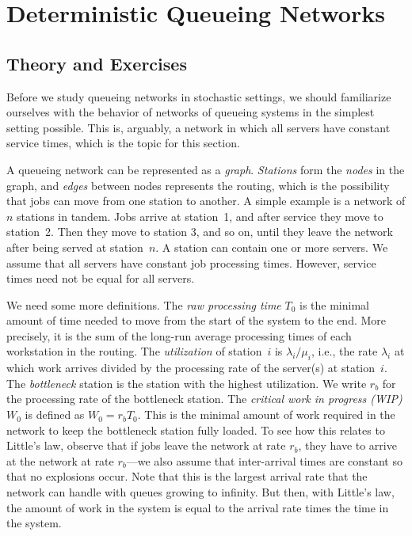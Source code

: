 
\section{Deterministic Queueing Networks}
\label{sec:determ-queu-netw}

\subsection*{Theory and Exercises}


Before we study queueing networks in stochastic settings, we should
familiarize ourselves with the behavior of networks of queueing
systems in the simplest setting possible.  This is, arguably, a network in which all servers have constant service times, which is the topic for this section.


A queueing network can be represented as a
\emph{graph}. \emph{Stations} form the \emph{nodes} in the graph, and
\emph{edges} between nodes represents the routing, which is the
possibility that jobs can move from one station to another. A simple
example is a network of $n$ stations in tandem. Jobs arrive at
station~1, and after service they move to station~2. Then they move to
station 3, and so on, until they leave the network after being served at
station~$n$.  A station can contain one or more servers. We assume that all servers have constant  job processing times. However, service times need not be equal for all servers.  

We need some more definitions. The \emph{raw processing time} $T_0$ is the minimal amount
of time  needed to move from the start of the system to the end. More precisely, it is the sum of the long-run average processing times of each workstation in the routing. The \emph{utilization} of station~$i$ is $\lambda_i/\mu_i$, i.e., the rate $\lambda_i$ at which work arrives divided by the processing rate of the server(s) at station~$i$. The \emph{bottleneck} station is the
station with the highest utilization. We write $r_b$ for the processing rate of the bottleneck station.  The \emph{critical  work in progress (WIP)}  $W_0$ is defined  as $W_0=r_b T_0$. This is the minimal amount of work required in the network to keep the bottleneck station fully loaded. To see how this relates to Little's law, observe that if jobs leave the network at rate $r_b$, they have to arrive at the network at rate $r_b$---we also assume that inter-arrival times are constant so that no explosions occur. Note that this is the largest arrival rate that the network can handle with queues growing to infinity. But then, with Little's law, the amount of work in the system is equal to the arrival rate times the time in the system.

